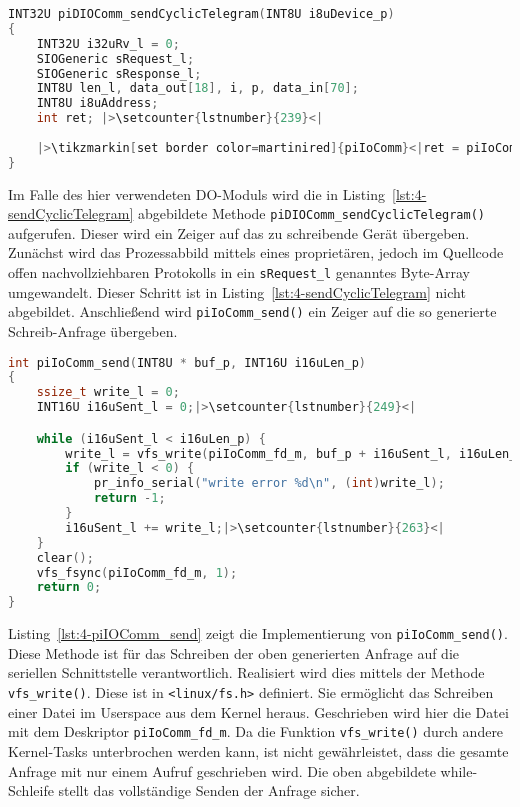 \begin{lstlisting}[language={c},firstnumber=161,caption={Auszug der Methode \lstinline{piDIOComm_sendCyclicTelegram} in \lstinline{piDIOComm.c}\label{lst:4-sendCyclicTelegram}}]
INT32U piDIOComm_sendCyclicTelegram(INT8U i8uDevice_p)
{
	INT32U i32uRv_l = 0;
	SIOGeneric sRequest_l;
	SIOGeneric sResponse_l;
	INT8U len_l, data_out[18], i, p, data_in[70];
	INT8U i8uAddress;
	int ret; |>\setcounter{lstnumber}{239}<|
	
    |>\tikzmarkin[set border color=martinired]{piIoComm}<|ret = piIoComm_send((INT8U *) & sRequest_l, IOPROTOCOL_HEADER_LENGTH + len_l + 1);  |>\tikzmarkend{piIoComm}\setcounter{lstnumber}{298}<|
}
\end{lstlisting}

Im Falle des hier verwendeten DO-Moduls wird die in Listing~\ref{lst:4-sendCyclicTelegram} abgebildete Methode \lstinline{piDIOComm_sendCyclicTelegram()} aufgerufen. Dieser wird ein Zeiger auf das zu schreibende Gerät übergeben. 
Zunächst wird das Prozessabbild mittels eines proprietären, jedoch im Quellcode offen nachvollziehbaren Protokolls in ein \lstinline{sRequest_l} genanntes Byte-Array umgewandelt. Dieser Schritt ist in Listing~\ref{lst:4-sendCyclicTelegram} nicht abgebildet. Anschließend wird \lstinline{piIoComm_send()} ein Zeiger auf die so generierte Schreib-Anfrage übergeben.

\begin{lstlisting}[language={c},firstnumber=220,caption={Auszug der Methode \lstinline{piIOComm_send} in \lstinline{piIOComm.c}\label{lst:4-piIOComm_send}}]
int piIoComm_send(INT8U * buf_p, INT16U i16uLen_p)
{
	ssize_t write_l = 0;
	INT16U i16uSent_l = 0;|>\setcounter{lstnumber}{249}<|

	while (i16uSent_l < i16uLen_p) {
		write_l = vfs_write(piIoComm_fd_m, buf_p + i16uSent_l, i16uLen_p - i16uSent_l, &piIoComm_fd_m->f_pos);
		if (write_l < 0) {
			pr_info_serial("write error %d\n", (int)write_l);
			return -1;
		} 
		i16uSent_l += write_l;|>\setcounter{lstnumber}{263}<|
	}
	clear();
	vfs_fsync(piIoComm_fd_m, 1);
	return 0;
}
\end{lstlisting}

Listing~\ref{lst:4-piIOComm_send} zeigt die Implementierung von \lstinline{piIoComm_send()}. Diese Methode ist für das Schreiben der oben generierten Anfrage auf die seriellen Schnittstelle verantwortlich. Realisiert wird dies mittels der Methode \lstinline{vfs_write()}. Diese ist in \lstinline{<linux/fs.h>} definiert. Sie ermöglicht das Schreiben einer Datei im Userspace aus dem Kernel heraus. Geschrieben wird hier die Datei mit dem Deskriptor \lstinline{piIoComm_fd_m}.
Da die Funktion \lstinline{vfs_write()} durch andere Kernel-Tasks unterbrochen werden kann, ist nicht gewährleistet, dass die gesamte Anfrage mit nur einem Aufruf geschrieben wird. Die oben abgebildete while-Schleife stellt das vollständige Senden der Anfrage sicher.

